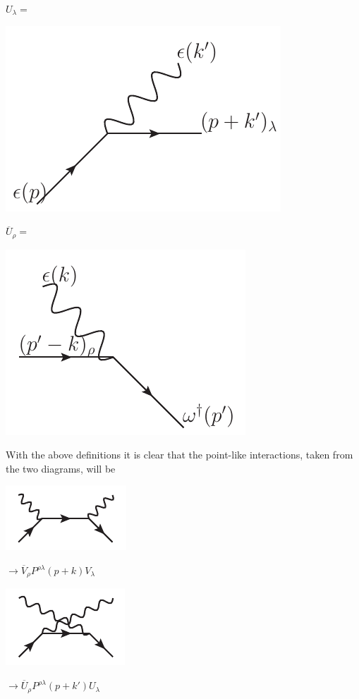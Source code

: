 \begin{center}
$U_\lambda = $
\begin{minipage}{2in}
   \includegraphics[scale=0.7]{eps/U-lambda} 
\end{minipage}
\hspace{5em}
$\overline{U}_\rho = $
\begin{minipage}{1.8in}
   \includegraphics[scale=0.7]{eps/U-bar-rho} 
\end{minipage}
\end{center}
With the above definitions it is clear that the point-like interactions, taken from the two diagrams, will be

\begin{minipage}{1in}
   \includegraphics[scale=1]{eps/uncrossed-small} 
\end{minipage}
$ \to \overline{V}_\rho P^{\rho \lambda}(p+k) V_\lambda$
\hspace{5em}
\begin{minipage}{1in}
   \includegraphics[scale=1]{eps/crossed-small} 
\end{minipage}
$ \to \overline{U}_\rho P^{\rho \lambda}(p+k') U_\lambda$



